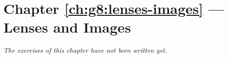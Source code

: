 \section*{Chapter \ref{ch:g8:lenses-images} --- Lenses and Images}


\emph{The exercises of this chapter have not been written yet.}
